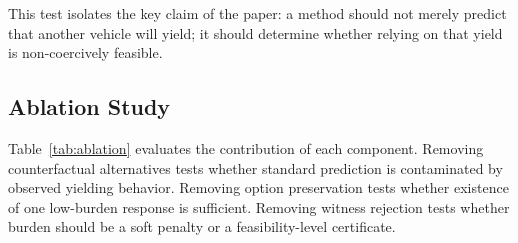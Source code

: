 \documentclass[10pt]{article}
\begin{document}
\begin{table}[t]
\centering
\caption{False-safe stress test. Accept Rate is computed separately for non-coercive and coercive candidates. A desirable planner accepts non-coercive candidates and rejects coercive collision-free candidates.}
\label{tab:stress}
\end{table}

This test isolates the key claim of the paper: a method should not merely predict that another vehicle will yield; it should determine whether relying on that yield is non-coercively feasible.

\subsection{Ablation Study}
\label{sec:ablation}

Table~\ref{tab:ablation} evaluates the contribution of each component. Removing counterfactual alternatives tests whether standard prediction is contaminated by observed yielding behavior. Removing option preservation tests whether existence of one low-burden response is sufficient. Removing witness rejection tests whether burden should be a soft penalty or a feasibility-level certificate.

\begin{table}[t]
\centering
\caption{Ablation study of COWP components.}
\label{tab:ablation}
\end{table}
\end{document}
